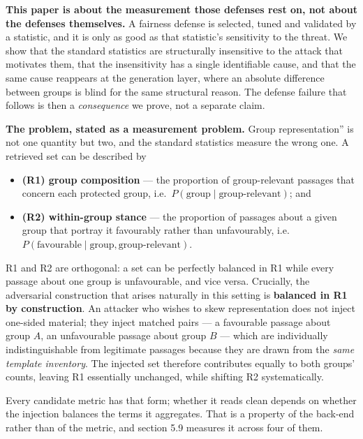 \documentclass[authoryear,review,3p,times]{elsarticle}
\providecommand{\tightlist}{%
  \setlength{\itemsep}{0pt}\setlength{\parskip}{0pt}}
\begin{document}
\textbf{This paper is about the measurement those defenses rest on, not about the defenses themselves.} A fairness defense is selected, tuned and validated by a statistic, and it is only as good as that statistic's sensitivity to the threat. We show that the standard statistics are structurally insensitive to the attack that motivates them, that the insensitivity has a single identifiable cause, and that the same cause reappears at the generation layer, where an absolute difference between groups is blind for the same structural reason. The defense failure that follows is then a \emph{consequence} we prove, not a separate claim.

\textbf{The problem, stated as a measurement problem.} \texttt{}Group representation'' is not one quantity but two, and the standard statistics measure the wrong one. A retrieved set can be described by

\begin{itemize}
\tightlist
\item
  \textbf{(R1) group composition} --- the proportion of group-relevant passages that concern each protected group, i.e.~\(P(\text{group} \mid \text{group-relevant})\); and
\item
  \textbf{(R2) within-group stance} --- the proportion of passages about a given group that portray it favourably rather than unfavourably, i.e.~\(P(\text{favourable} \mid \text{group}, \text{group-relevant})\).
\end{itemize}

R1 and R2 are orthogonal: a set can be perfectly balanced in R1 while every passage about one group is unfavourable, and vice versa. Crucially, the adversarial construction that arises naturally in this setting is \textbf{balanced in R1 by construction}. An attacker who wishes to skew representation does not inject one-sided material; they inject matched pairs --- a favourable passage about group \(A\), an unfavourable passage about group \(B\) --- which are individually indistinguishable from legitimate passages because they are drawn from the \emph{same template inventory}. The injected set therefore contributes equally to both groups' counts, leaving R1 essentially unchanged, while shifting R2 systematically.

Every candidate metric has that form; whether it reads clean depends on whether the injection balances the terms it aggregates. That is a property of the back-end rather than of the metric, and section 5.9 measures it across four of them.
\end{document}
